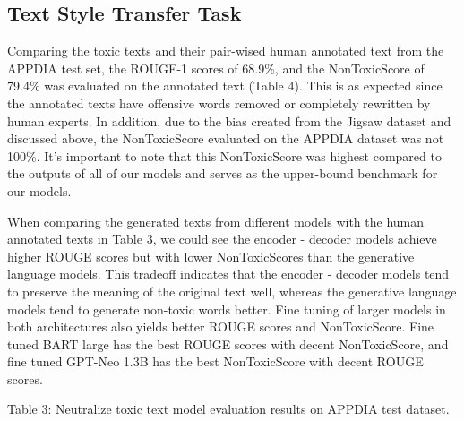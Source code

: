 \documentclass[11pt]{article}
\begin{document}
\subsection{Text Style Transfer Task}
Comparing the toxic texts and their pair-wised human annotated text from the APPDIA test set, the ROUGE-1 scores of 68.9\%, and the NonToxicScore of 79.4\% was evaluated on the annotated text (Table 4). This is as expected since the annotated texts have offensive words removed or completely rewritten by human experts. In addition, due to the bias created from the Jigsaw dataset and discussed above, the NonToxicScore evaluated on the APPDIA dataset was not 100\%. It’s important to note that this NonToxicScore was highest compared to the outputs of all of our models and serves as the upper-bound benchmark for our models. 

When comparing the generated texts from different models with the human annotated texts in Table 3, we could see the encoder - decoder models achieve higher ROUGE scores but with lower NonToxicScores than the generative language models. This tradeoff indicates that the encoder - decoder models tend to preserve the meaning of the original text well, whereas the generative language models tend to generate non-toxic words better. Fine tuning of larger models in both architectures also yields better ROUGE scores and NonToxicScore. Fine tuned BART large has the best ROUGE scores with decent NonToxicScore, and fine tuned GPT-Neo 1.3B has the best NonToxicScore with decent ROUGE scores.

\begin{table*}[ht]
\centering
{}
Table 3:  Neutralize toxic text model evaluation results on APPDIA test dataset.
\end{table*}
\end{document}
